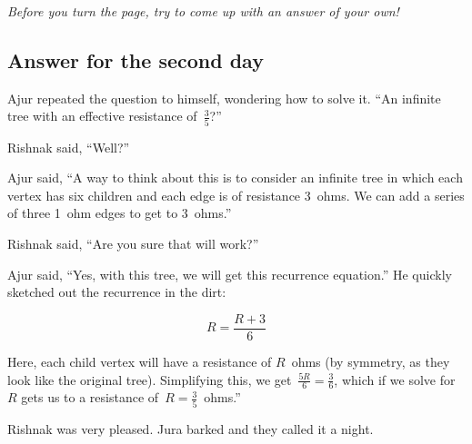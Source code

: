 \textit{Before you turn the page, try to come up with an answer of your own!}

\newpage
\subsection*{Answer for the second day}
Ajur repeated the question to himself, wondering how to solve it. ``An infinite tree with an effective resistance of~$\frac{3}{5}$?''

Rishnak said, ``Well?''

Ajur said, ``A way to think about this is to consider an infinite tree in which each vertex has six children and each edge is of resistance 3~ohms. We can add a series of three 1~ohm edges to get to 3~ohms.''

Rishnak said, ``Are you sure that will work?''

Ajur said, ``Yes, with this tree, we will get this recurrence equation.''  He quickly sketched out the recurrence in the dirt:

$$R=\frac{R+3}{6}$$

\noindent Here, each child vertex will have a resistance of $R$~ohms (by symmetry, as they look like the original tree). Simplifying this, we get~$\frac{5R}{6}=\frac{3}{6}$, which if we solve for~$R$ gets us to a resistance of~$R=\frac{3}{5}$~ohms.''

Rishnak was very pleased. Jura barked and they called it a night.